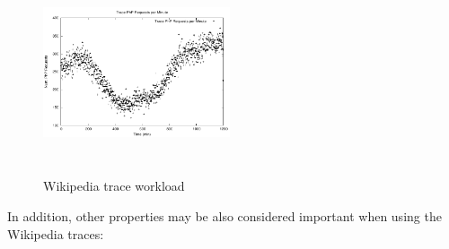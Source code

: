 \begin{figure}
\begin{center}
\includegraphics[width=0.49\textwidth, height=6cm]{./images/traceWorkload}
\end{center}
\caption{Wikipedia trace workload}
\label{workload}
\end{figure}

In addition, other properties may be also considered important when using the Wikipedia traces:

